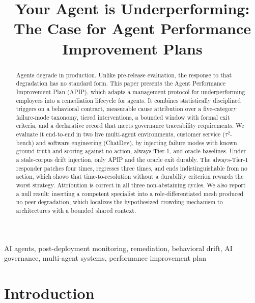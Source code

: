 \documentclass[conference]{IEEEtran}
\begin{document}
\title{Your Agent is Underperforming:\\
The Case for Agent Performance Improvement Plans}

\author{
}

\maketitle

\begin{abstract}
Agents degrade in production. Unlike pre-release evaluation, the response to
that degradation has no standard form. This paper presents the Agent Performance
Improvement Plan (APIP), which adapts a management protocol for
underperforming employees into a remediation lifecycle for agents. It combines
statistically
disciplined triggers on a behavioral contract, measurable cause attribution
over a five-category failure-mode taxonomy, tiered interventions, a bounded
window with formal exit criteria, and a declarative record that meets
governance traceability requirements. We evaluate it end-to-end in two live
multi-agent environments, customer service ($\tau^2$-bench) and software
engineering (ChatDev), by injecting failure modes with known ground truth and
scoring against no-action, always-Tier-1, and oracle baselines. Under a
stale-corpus drift injection, only APIP and the oracle exit durably. The
always-Tier-1 responder patches four times, regresses three times, and ends
indistinguishable from no action, which shows that time-to-resolution without
a durability criterion rewards the worst strategy. Attribution is correct in
all three non-abstaining cycles. We also report a null result: inserting a
competent specialist into a role-differentiated mesh produced no peer
degradation, which localizes the hypothesized crowding mechanism to
architectures with a bounded shared context.
\end{abstract}

\begin{IEEEkeywords}
AI agents, post-deployment monitoring, remediation, behavioral drift, AI
governance, multi-agent systems, performance improvement plan
\end{IEEEkeywords}

\section{Introduction}
\end{document}
